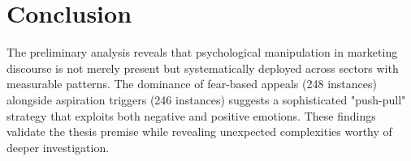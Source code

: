 \section{Conclusion}

The preliminary analysis reveals that psychological manipulation in marketing discourse is not merely present but systematically deployed across sectors with measurable patterns. The dominance of fear-based appeals (248 instances) alongside aspiration triggers (246 instances) suggests a sophisticated "push-pull" strategy that exploits both negative and positive emotions. These findings validate the thesis premise while revealing unexpected complexities worthy of deeper investigation.